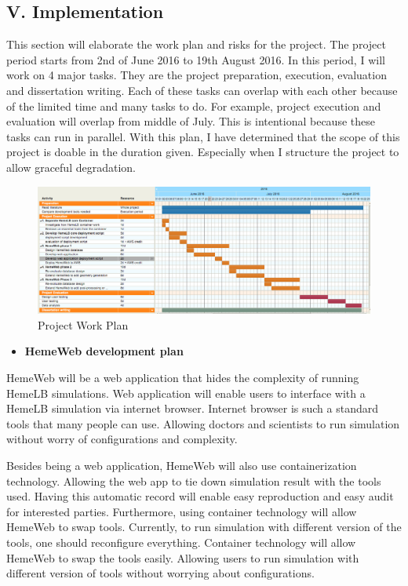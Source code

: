 \documentclass[]{article}
\providecommand{\tightlist}{%
  \setlength{\itemsep}{0pt}\setlength{\parskip}{0pt}}
\begin{document}
\subsection{V. Implementation}\label{v.-implementation}

This section will elaborate the work plan and risks for the project. The
project period starts from 2nd of June 2016 to 19th August 2016. In this
period, I will work on 4 major tasks. They are the project preparation,
execution, evaluation and dissertation writing. Each of these tasks can
overlap with each other because of the limited time and many tasks to
do. For example, project execution and evaluation will overlap from
middle of July. This is intentional because these tasks can run in
parallel. With this plan, I have determined that the scope of this
project is doable in the duration given. Especially when I structure the
project to allow graceful degradation.

\begin{figure}[H]
\centering
\includegraphics{../resources/images/workplan.png}
\caption{Project Work Plan}
\end{figure}

\begin{itemize}
\tightlist
\item
  \textbf{HemeWeb development plan}
\end{itemize}

HemeWeb will be a web application that hides the complexity of running
HemeLB simulations. Web application will enable users to interface with
a HemeLB simulation via internet browser. Internet browser is such a
standard tools that many people can use. Allowing doctors and scientists
to run simulation without worry of configurations and complexity.

Besides being a web application, HemeWeb will also use containerization
technology. Allowing the web app to tie down simulation result with the
tools used. Having this automatic record will enable easy reproduction
and easy audit for interested parties. Furthermore, using container
technology will allow HemeWeb to swap tools. Currently, to run
simulation with different version of the tools, one should reconfigure
everything. Container technology will allow HemeWeb to swap the tools
easily. Allowing users to run simulation with different version of tools
without worrying about configurations.
\end{document}
